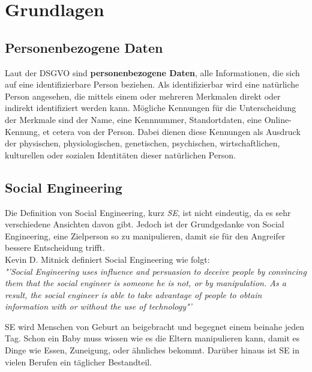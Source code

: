 
\chapter {Grundlagen}  %
\label{cha:grundlagen} %

\section{Personenbezogene Daten}
Laut der DSGVO sind \textbf{personenbezogene Daten}, alle Informationen, die sich auf eine identifizierbare Person beziehen. Als identifizierbar wird eine natürliche Person angesehen, die mittels einem oder mehreren Merkmalen direkt oder indirekt identifiziert werden kann. Mögliche Kennungen für die Unterscheidung der Merkmale sind der Name, eine Kennnummer, Standortdaten, eine Online-Kennung, et cetera von der Person. Dabei dienen diese Kennungen als Ausdruck der physischen, physiologischen, genetischen, psychischen, wirtschaftlichen, kulturellen oder sozialen Identitäten dieser natürlichen Person. \cite{personenbezogeneDaten}

\section{Social Engineering} %
\label {sec:Social Engineering} %
	Die Definition von Social Engineering, kurz \textit{SE}, ist nicht eindeutig, da es sehr verschiedene Ansichten davon gibt. Jedoch ist der Grundgedanke von Social Engineering, eine Zielperson so zu manipulieren, damit sie für den Angreifer bessere Entscheidung trifft. \cite{ArtOfHumanHacking} \\
	Kevin D. Mitnick definiert Social Engineering wie folgt:\\	
	\textit{"'Social Engineering uses influence and persuasion to deceive people by convincing them that the social engineer is someone he is not, or by manipulation. As a result, the social engineer is able to take advantage of people to obtain information with or without the use of technology"'}\cite{ArtOfDeception}
	
	SE wird Menschen von Geburt an beigebracht und begegnet einem beinahe jeden Tag. Schon ein Baby muss wissen wie es die Eltern manipulieren kann, damit es Dinge wie Essen, Zuneigung, oder ähnliches bekommt. Darüber hinaus ist SE in vielen Berufen ein täglicher Bestandteil. %
	

